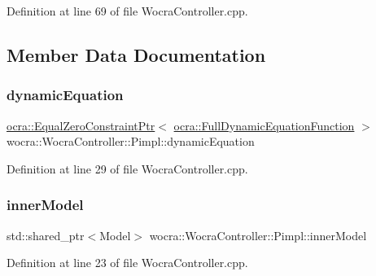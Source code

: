 Definition at line 69 of file Wocra\+Controller.\+cpp.



\subsection{Member Data Documentation}
\hypertarget{structwocra_1_1WocraController_1_1Pimpl_a1109652d5d4a11542cc5130713977b73}{}\label{structwocra_1_1WocraController_1_1Pimpl_a1109652d5d4a11542cc5130713977b73} 
\subsubsection{\texorpdfstring{dynamic\+Equation}{dynamicEquation}}
{\footnotesize\ttfamily \hyperlink{classocra_1_1EqualZeroConstraintPtr}{ocra\+::\+Equal\+Zero\+Constraint\+Ptr}$<$ \hyperlink{classocra_1_1FullDynamicEquationFunction}{ocra\+::\+Full\+Dynamic\+Equation\+Function} $>$ wocra\+::\+Wocra\+Controller\+::\+Pimpl\+::dynamic\+Equation}



Definition at line 29 of file Wocra\+Controller.\+cpp.

\hypertarget{structwocra_1_1WocraController_1_1Pimpl_a4fe5b4fd5e927bbf9c83bf10ffafc98f}{}\label{structwocra_1_1WocraController_1_1Pimpl_a4fe5b4fd5e927bbf9c83bf10ffafc98f} 
\subsubsection{\texorpdfstring{inner\+Model}{innerModel}}
{\footnotesize\ttfamily std\+::shared\+\_\+ptr$<$Model$>$ wocra\+::\+Wocra\+Controller\+::\+Pimpl\+::inner\+Model}



Definition at line 23 of file Wocra\+Controller.\+cpp.

\hypertarget{structwocra_1_1WocraController_1_1Pimpl_a761307f74ee3b130993d589372164b98}{}\label{structwocra_1_1WocraController_1_1Pimpl_a761307f74ee3b130993d589372164b98} 
